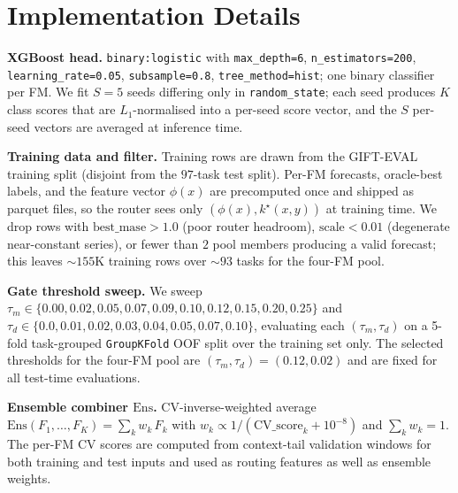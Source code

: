 \documentclass{article}
\theoremstyle{plain}
\theoremstyle{definition}
\theoremstyle{remark}
\begin{document}
\newpage



\appendix
\onecolumn
\section{Implementation Details}
\label{app:impl}



\textbf{XGBoost head.} \texttt{binary:logistic} with \texttt{max\_depth=6}, \texttt{n\_estimators=200}, \texttt{learning\_rate=0.05}, \texttt{subsample=0.8}, \texttt{tree\_method=hist}; one binary classifier per FM. We fit $S{=}5$ seeds differing only in \texttt{random\_state}; each seed produces $K$ class scores that are $L_1$-normalised into a per-seed score vector, and the $S$ per-seed vectors are averaged at inference time.

\textbf{Training data and filter.} Training rows are drawn from the GIFT-EVAL training split (disjoint from the $97$-task test split). Per-FM forecasts, oracle-best labels, and the feature vector $\phi(x)$ are precomputed once and shipped as parquet files, so the router sees only $(\phi(x), k^\star(x, y))$ at training time. We drop rows with $\mathrm{best\_mase} > 1.0$ (poor router headroom), $\mathrm{scale} < 0.01$ (degenerate near-constant series), or fewer than $2$ pool members producing a valid forecast; this leaves $\sim$$155$K training rows over $\sim$$93$ tasks for the four-FM pool.


\textbf{Gate threshold sweep.} We sweep $\tau_m \in \{0.00, 0.02, 0.05, 0.07, 0.09, 0.10, 0.12, 0.15, 0.20, 0.25\}$ and $\tau_d \in \{0.0, 0.01, 0.02, 0.03, 0.04, 0.05, 0.07, 0.10\}$, evaluating each $(\tau_m, \tau_d)$ on a 5-fold task-grouped \texttt{GroupKFold} OOF split over the training set only. The selected thresholds for the four-FM pool are $(\tau_m, \tau_d) = (0.12, 0.02)$ and are fixed for all test-time evaluations.

\textbf{Ensemble combiner $\mathrm{Ens}$.} CV-inverse-weighted average $\mathrm{Ens}(F_1, \dots, F_K) = \sum_k w_k\, F_k$ with $w_k \propto 1/(\mathrm{CV\_score}_k + 10^{-8})$ and $\sum_k w_k = 1$. The per-FM CV scores are computed from context-tail validation windows for both training and test inputs and used as routing features as well as ensemble weights.
\end{document}
